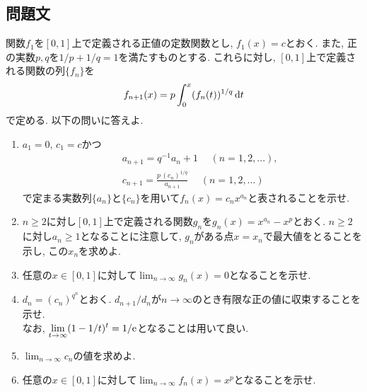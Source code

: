 \documentclass[dvipdfmx,titlepage, 11pt, a4paper]{jsarticle}%
\begin{document}
\subsection{問題文}
関数$f_{1}$を$[0,1]$上で定義される正値の定数関数とし, $f_{1}(x)=c$とおく. また, 正の実数$p,q$を$1/p+1/q=1$を満たすものとする. これらに対し, $[0,1]$上で定義される関数の列$\{f_{n}\}$を
\begin{eqnarray*}
	f_{n+1}(x)=p\int_{0}^{x}(f_{n}(t))^{1/q}\,{\rm d} t
\end{eqnarray*}
で定める. 以下の問いに答えよ.
\begin{enumerate}[(1)]
	\setlength{\itemsep}{10pt}
	\item $a_{1}=0,\,c_{1}=c$かつ
	      \begin{eqnarray*}
		      && a_{n+1}=q^{-1}a_{n}+1\hspace{15pt} (n=1,2,...),\\
		      && c_{n+1}=\frac{p\,(c_{n})^{1/q}}{a_{n+1}}\hspace{15pt} (n=1,2,...)
	      \end{eqnarray*}
	      で定まる実数列$\{a_{n}\}$と$\{c_{n}\}$を用いて$f_{n}(x)=c_{n}x^{a_{n}}$と表されることを示せ.
	\item $n\geq 2$に対し$[0,1]$上で定義される関数$g_{n}$を$g_{n}(x)=x^{a_{n}}-x^{p}$とおく. $n\geq 2$に対し$a_{n}\geq 1$となることに注意して, $g_{n}$がある点$x=x_{n}$で最大値をとることを示し, この$x_{n}$を求めよ.
	\item 任意の$x\in [0,1]$に対して$\displaystyle \lim_{n\to \infty}g_{n}(x)=0$となることを示せ.
	\item $d_{n}=(c_{n})^{q^{n}}$とおく. $d_{n+1}/d_{n}$が$n\to \infty$のとき有限な正の値に収束することを示せ.\\
	      なお, $\displaystyle \lim_{t\to \infty}(1-1/t)^{t}=1/{\rm e}$となることは用いて良い.
	\item $\displaystyle \lim_{n\to \infty}c_{n}$の値を求めよ.
	\item 任意の$x\in[0,1]$に対して$\displaystyle \lim_{n\to \infty}f_{n}(x)=x^{p}$となることを示せ.
\end{enumerate}
\newpage
\end{document}
